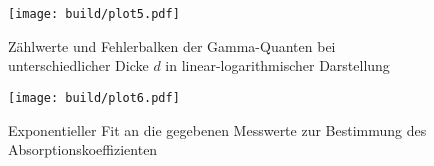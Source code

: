 \begin{figure}[t]
  \centering
  \texttt{[image: build/plot5.pdf]}
  \caption{Zählwerte und Fehlerbalken der Gamma-Quanten bei unterschiedlicher Dicke $d$ in linear-logarithmischer Darstellung} 
  \label{fig:plot5}
\end{figure}
\clearpage
\begin{figure}[t]
  \centering
  \texttt{[image: build/plot6.pdf]}
  \caption{Exponentieller Fit an die gegebenen Messwerte zur Bestimmung des Absorptionskoeffizienten} 
  \label{fig:plot6}
\end{figure}
\begin{flushleft}
~
\end{flushleft}